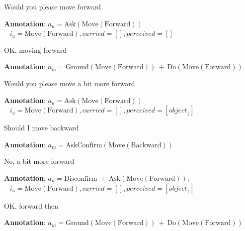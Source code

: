 \begin{Transcript}[p]
\begin{dialogue} \vspace{5mm}
 Would you please move forward \\[1mm]
\begin{footnotesize}\textbf{Annotation}: $a_u\!=\!\mathrm{Ask(Move(Forward))}$\\ $\phantom{1}$\hspace{16mm} $i_u\!=\!\mathrm{Move(Forward)}, \mathit{carried}\!=\![],\mathit{perceived}\!=\![]$\end{footnotesize} \vspace{3mm}
 OK, moving forward \\[1mm]
\begin{footnotesize}\textbf{Annotation}: $a_m\!=\!\mathrm{Ground(Move(Forward)) }  \ + \ \mathrm{ Do(Move(Forward))}$ \end{footnotesize}\vspace{3mm}
 Would you please move a bit more forward \\[1mm]
\begin{footnotesize}\textbf{Annotation}: $a_u\!=\!\mathrm{Ask(Move(Forward))}$\\$\phantom{1}$\hspace{16mm} $i_u\!=\!\mathrm{Move(Forward)}, \mathit{carried}\!=\![],\mathit{perceived}\!=\![\mathit{object}_1]$\end{footnotesize}\vspace{3mm}
 Should I move backward \\[1mm]
\begin{footnotesize}\textbf{Annotation}: $a_m\!=\!\mathrm{AskConfirm(Move(Backward))}$\end{footnotesize} \vspace{3mm}
 No, a bit more forward \\[1mm]
\begin{footnotesize}\textbf{Annotation}: $a_u\!=\!\mathrm{Disconfirm } \ + \ \mathrm{ Ask(Move(Forward))}, $ \\$\phantom{1}$\hspace{16mm} $i_u\!=\!\mathrm{Move(Forward)}, \mathit{carried}\!=\![], \mathit{perceived}\!=\![\mathit{object}_1]$\end{footnotesize}\vspace{3mm}
 OK, forward then \\[1mm] 
\begin{footnotesize}\textbf{Annotation}: $a_m\!=\!\mathrm{Ground(Move(Forward)) }  \ + \ \mathrm{ Do(Move(Forward))}$ \end{footnotesize} \vspace{3mm}

\end{dialogue}
\end{Transcript}
